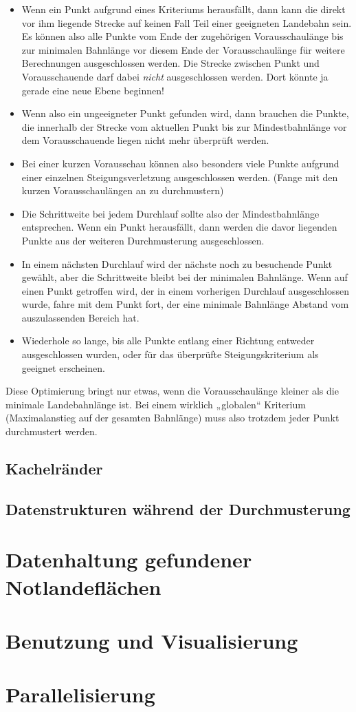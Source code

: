 \documentclass[
11pt, %
a4paper, %
oneside, %
pdfspacing, %
headinclude,
BCOR5mm, %
ngerman, %
bibtotocnumbered,
]{scrartcl}
\begin{document}
\begin{itemize}
\item Wenn ein Punkt aufgrund eines Kriteriums herausfällt, dann kann die direkt vor ihm liegende Strecke auf keinen Fall Teil einer geeigneten Landebahn sein. 
Es können also alle Punkte vom Ende der zugehörigen Vorausschaulänge bis zur minimalen Bahnlänge vor diesem Ende der Vorausschaulänge für weitere Berechnungen ausgeschlossen werden. Die Strecke zwischen Punkt und Vorausschauende darf dabei \emph{nicht} ausgeschlossen werden. Dort könnte ja gerade eine neue Ebene beginnen!
\item Wenn also ein ungeeigneter Punkt gefunden wird, dann brauchen die Punkte, die innerhalb der Strecke vom aktuellen Punkt bis zur Mindestbahnlänge vor dem Vorausschauende liegen nicht mehr überprüft werden.
\item Bei einer kurzen Vorausschau können also besonders viele Punkte aufgrund einer einzelnen Steigungsverletzung ausgeschlossen werden. (Fange mit den kurzen Vorausschaulängen an zu durchmustern)
\item Die Schrittweite bei jedem Durchlauf sollte also der Mindestbahnlänge entsprechen. Wenn ein Punkt herausfällt, dann werden die davor liegenden Punkte aus der weiteren Durchmusterung ausgeschlossen.
\item In einem nächsten Durchlauf wird der nächste noch zu besuchende Punkt gewählt, aber die Schrittweite bleibt bei der minimalen Bahnlänge. Wenn auf einen Punkt getroffen wird, der in einem vorherigen Durchlauf ausgeschlossen wurde, fahre mit dem Punkt fort, der eine minimale Bahnlänge Abstand vom auszulassenden Bereich hat.
\item Wiederhole so lange, bis alle Punkte entlang einer Richtung entweder ausgeschlossen wurden, oder für das überprüfte Steigungskriterium als geeignet erscheinen.

\end{itemize}
Diese Optimierung bringt nur etwas, wenn die Vorausschaulänge kleiner als die minimale Landebahnlänge ist. Bei einem wirklich „globalen“ Kriterium (Maximalanstieg auf der gesamten Bahnlänge) muss also trotzdem jeder Punkt durchmustert werden.


\subsection{Kachelränder}

\subsection{Datenstrukturen während der Durchmusterung}

\section{Datenhaltung gefundener Notlandeflächen}

\section{Benutzung und Visualisierung}

\section{Parallelisierung}
\end{document}
